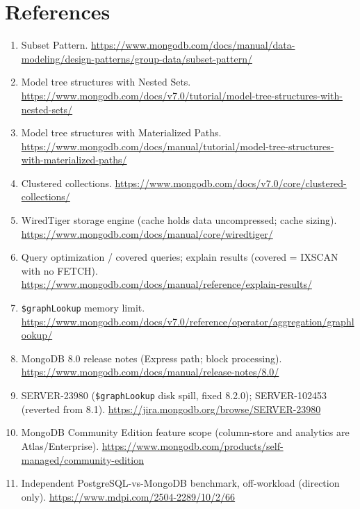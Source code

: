 \documentclass[11pt]{article}
\newcommand{\code}[1]{\texttt{#1}}
\begin{document}
\section*{References}
\small
\begin{enumerate}\itemsep2pt
\item Subset Pattern. \url{https://www.mongodb.com/docs/manual/data-modeling/design-patterns/group-data/subset-pattern/}
\item Model tree structures with Nested Sets. \url{https://www.mongodb.com/docs/v7.0/tutorial/model-tree-structures-with-nested-sets/}
\item Model tree structures with Materialized Paths. \url{https://www.mongodb.com/docs/manual/tutorial/model-tree-structures-with-materialized-paths/}
\item Clustered collections. \url{https://www.mongodb.com/docs/v7.0/core/clustered-collections/}
\item WiredTiger storage engine (cache holds data uncompressed; cache sizing). \url{https://www.mongodb.com/docs/manual/core/wiredtiger/}
\item Query optimization / covered queries; explain results (covered = IXSCAN with no FETCH). \url{https://www.mongodb.com/docs/manual/reference/explain-results/}
\item \code{\$graphLookup} memory limit. \url{https://www.mongodb.com/docs/v7.0/reference/operator/aggregation/graphlookup/}
\item MongoDB 8.0 release notes (Express path; block processing). \url{https://www.mongodb.com/docs/manual/release-notes/8.0/}
\item SERVER-23980 (\code{\$graphLookup} disk spill, fixed 8.2.0); SERVER-102453 (reverted from 8.1). \url{https://jira.mongodb.org/browse/SERVER-23980}
\item MongoDB Community Edition feature scope (column-store and analytics are Atlas/Enterprise). \url{https://www.mongodb.com/products/self-managed/community-edition}
\item Independent PostgreSQL-vs-MongoDB benchmark, off-workload (direction only). \url{https://www.mdpi.com/2504-2289/10/2/66}
\end{enumerate}
\end{document}
